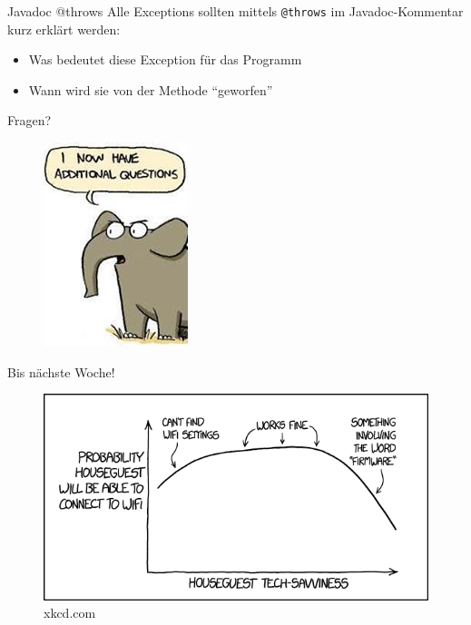 \documentclass[18pt]{beamer}
\newcommand{\quotes}[1]{``#1''}
\begin{document}
\begin{frame}{Javadoc @throws}
    Alle Exceptions sollten mittels \texttt{@throws} im Javadoc-Kommentar kurz erklärt werden:
    \begin{itemize}
        \item Was bedeutet diese Exception für das Programm
        \item Wann wird sie von der Methode \quotes{geworfen}
    \end{itemize}
\end{frame}

\appendix
\beginbackup

\begin{frame}{Fragen?}
    \begin{figure}
        \includegraphics[scale=.6]{img/additionalquestions.jpg}
    \end{figure}
\end{frame}

\begin{frame}{Bis nächste Woche!}
    \begin{figure}
        \includegraphics[scale=.5]{img/wifi.png}
        \caption{\footnotesize{xkcd.com}}
    \end{figure}
\end{frame}

\backupend
\end{document}

